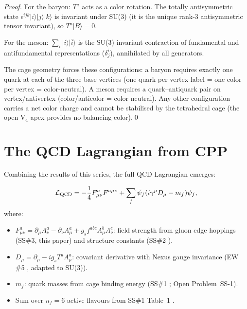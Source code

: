 \documentclass[11pt,a4paper]{article}
\newcommand{\ket}[1]{|#1\rangle}
\begin{document}
\begin{proof}
For the baryon: $T^a$ acts as a color rotation.  The totally
antisymmetric state $\epsilon^{ijk}\ket{i}\ket{j}\ket{k}$ is
invariant under SU(3) (it is the unique rank-3 antisymmetric
tensor invariant), so $T^a\ket{B} = 0$.

For the meson: $\sum_i\ket{i}\ket{\bar{i}}$ is the SU(3)
invariant contraction of fundamental and antifundamental
representations ($\delta^i_j$), annihilated by all generators.

The cage geometry forces these configurations: a baryon requires
exactly one quark at each of the three base vertices (one quark
per vertex label = one color per vertex = color-neutral).  A
meson requires a quark--antiquark pair on vertex/antivertex
(color/anticolor = color-neutral).  Any other configuration
carries a net color charge and cannot be stabilised by the
tetrahedral cage (the open V$_4$ apex provides no balancing
color).\qed
\end{proof}

\section{The QCD Lagrangian from CPP}

Combining the results of this series, the full QCD Lagrangian
emerges:

\begin{equation}
\mathcal{L}_{\rm QCD}
= -\frac{1}{4}F^a_{\mu\nu}F^{a\mu\nu}
+ \sum_f \bar{\psi}_f(i\gamma^\mu D_\mu - m_f)\psi_f,
\label{eq:LQCD}
\end{equation}
where:
\begin{itemize}
\item $F^a_{\mu\nu} = \partial_\mu A^a_\nu - \partial_\nu A^a_\mu
  + g_s f^{abc}A^b_\mu A^c_\nu$: field strength from gluon
  edge hoppings (SS\#3, this paper) and structure constants
  (SS\#2 \citep{cpp_ss2}).
\item $D_\mu = \partial_\mu - ig_s T^a A^a_\mu$: covariant
  derivative with Nexus gauge invariance (EW \#5
  \citep{cpp_ew5}, adapted to SU(3)).
\item $m_f$: quark masses from cage binding energy (SS\#1
  \citep{cpp_ss1}; Open Problem~SS-1).
\item Sum over $n_f = 6$ active flavours from SS\#1
  Table~1 \citep{cpp_ss1}.
\end{itemize}
\end{document}
